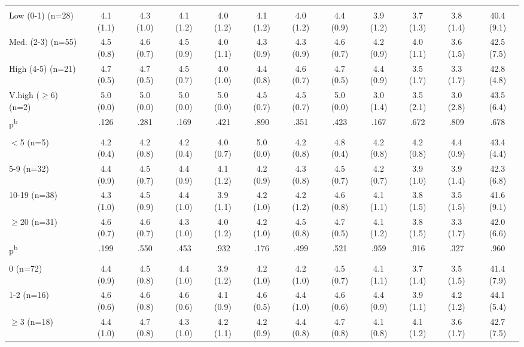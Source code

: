 \begin{landscape}
\begin{table}[htbp]
\begin{adjustbox}{scale=0.8, center}
\begin{threeparttable}
\begin{tabular}{@{}l@{\hspace{3pt}}c|c|c|c|c|c|c|c|c|c@{\hspace{3pt}}c@{}}
\addlinespace[1pt]
\multicolumn{12}{@{}l}{\textit{\scriptsize HSI}} \\
Low (0-1) (n=28) & 4.1 (1.1) & 4.3 (1.0) & 4.1 (1.2) & 4.0 (1.2) & 4.1 (1.2) & 4.0 (1.2) & 4.4 (0.9) & 3.9 (1.2) & 3.7 (1.3) & 3.8 (1.4) & 40.4 (9.1) \\
Med. (2-3) (n=55) & 4.5 (0.8) & 4.6 (0.7) & 4.5 (0.9) & 4.0 (1.1) & 4.3 (0.9) & 4.3 (0.9) & 4.6 (0.7) & 4.2 (0.9) & 4.0 (1.1) & 3.6 (1.5) & 42.5 (7.5) \\
High (4-5) (n=21) & 4.7 (0.5) & 4.7 (0.5) & 4.5 (0.7) & 4.0 (1.0) & 4.4 (0.8) & 4.6 (0.7) & 4.7 (0.5) & 4.4 (0.9) & 3.5 (1.7) & 3.3 (1.7) & 42.8 (4.8) \\
V.high ($\geq$6) (n=2) & 5.0 (0.0) & 5.0 (0.0) & 5.0 (0.0) & 5.0 (0.0) & 4.5 (0.7) & 4.5 (0.7) & 5.0 (0.0) & 3.0 (1.4) & 3.5 (2.1) & 3.0 (2.8) & 43.5 (6.4) \\
  p\textsuperscript{b} & .126 & .281 & .169 & .421 & .890 & .351 & .423 & .167 & .672 & .809 & .678 \\[0.5pt]
\addlinespace[1pt]
\multicolumn{12}{@{}l}{\textit{\scriptsize Cigarettes/Day}} \\
$<$5 (n=5) & 4.2 (0.4) & 4.2 (0.8) & 4.2 (0.4) & 4.0 (0.7) & 5.0 (0.0) & 4.2 (0.8) & 4.8 (0.4) & 4.2 (0.8) & 4.2 (0.8) & 4.4 (0.9) & 43.4 (4.4) \\
5-9 (n=32) & 4.4 (0.9) & 4.5 (0.7) & 4.4 (0.9) & 4.1 (1.2) & 4.2 (0.9) & 4.3 (0.8) & 4.5 (0.7) & 4.2 (0.7) & 3.9 (1.0) & 3.9 (1.4) & 42.3 (6.8) \\
10-19 (n=38) & 4.3 (1.0) & 4.5 (0.9) & 4.4 (1.0) & 3.9 (1.1) & 4.2 (1.0) & 4.2 (1.2) & 4.6 (0.8) & 4.1 (1.1) & 3.8 (1.5) & 3.5 (1.5) & 41.6 (9.1) \\
$\geq$20 (n=31) & 4.6 (0.7) & 4.6 (0.7) & 4.3 (1.0) & 4.0 (1.2) & 4.2 (1.0) & 4.5 (0.8) & 4.7 (0.5) & 4.1 (1.2) & 3.8 (1.5) & 3.3 (1.7) & 42.0 (6.6) \\
  p\textsuperscript{b} & .199 & .550 & .453 & .932 & .176 & .499 & .521 & .959 & .916 & .327 & .960 \\[0.5pt]
\addlinespace[1pt]
\multicolumn{12}{@{}l}{\textit{\scriptsize Quit Attempts}} \\
0 (n=72) & 4.4 (0.9) & 4.5 (0.8) & 4.4 (1.0) & 3.9 (1.2) & 4.2 (1.0) & 4.2 (1.0) & 4.5 (0.7) & 4.1 (1.1) & 3.7 (1.4) & 3.5 (1.5) & 41.4 (7.9) \\
1-2 (n=16) & 4.6 (0.6) & 4.6 (0.8) & 4.6 (0.6) & 4.1 (0.9) & 4.6 (0.5) & 4.4 (1.0) & 4.6 (0.6) & 4.4 (0.9) & 3.9 (1.1) & 4.2 (1.2) & 44.1 (5.4) \\
$\geq$3 (n=18) & 4.4 (1.0) & 4.7 (0.8) & 4.3 (1.0) & 4.2 (1.1) & 4.2 (0.9) & 4.4 (0.8) & 4.7 (0.8) & 4.1 (0.8) & 4.1 (1.2) & 3.6 (1.7) & 42.7 (7.5) \\

\end{tabular}
\end{threeparttable}
\end{adjustbox}
\end{table}
\end{landscape}
